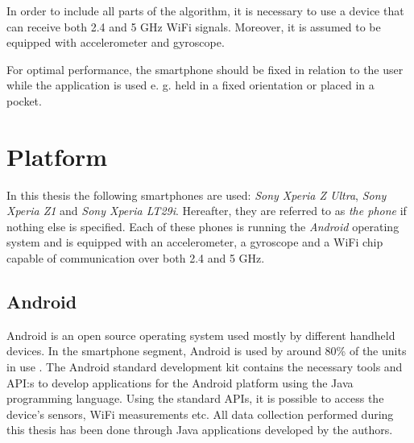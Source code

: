 \documentclass{LTHthesis}
\begin{document}
In order to include all parts of the algorithm, it is necessary to use a device that can receive both 2.4 and 5 GHz WiFi signals. Moreover, it is assumed to be equipped with accelerometer and gyroscope.

For optimal performance, the smartphone should be fixed in relation to the user while the application is used e. g. held in a fixed orientation or placed in a pocket. 

%
\section{Platform}

%
In this thesis the following smartphones are used: \emph{Sony Xperia Z Ultra}, \emph{Sony Xperia Z1} and \emph{Sony Xperia LT29i}. Hereafter, they are referred to as \emph{the phone} if nothing else is specified. Each of these phones is running the \emph{Android} operating system and is equipped with an accelerometer, a gyroscope and a WiFi chip capable of communication over both 2.4 and 5 GHz.
%
\subsection{Android} 
%
Android is an open source operating system used mostly by different handheld devices. In the smartphone segment, Android is used by around 80\% of the units in use \cite{android}. The Android standard development kit contains the necessary tools and API:s to develop applications for the Android platform using the Java programming language. Using the standard APIs, it is possible to access the device's sensors, WiFi measurements etc. All data collection performed during this thesis has been done through Java applications developed by the authors. 
%
\end{document}
